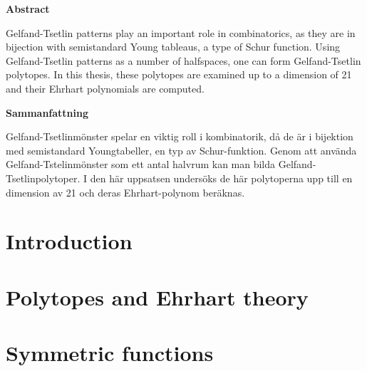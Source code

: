\documentclass[12pt, a4paper, twoside]{article}
\theoremstyle{definition}
\theoremstyle{example}
\theoremstyle{plain}
\theoremstyle{remark}
\numberwithin{equation}{section}
\numberwithin{figure}{section}
\begin{document}
\setlength{\voffset}{0cm}
\setlength{\hoffset}{0cm}

\setlength{\voffset}{-2.54cm}
\setlength{\hoffset}{-2.54cm}



\clearpage{\thispagestyle{empty}\cleardoublepage}

\begin{center}
	\textbf{Abstract}
\end{center}
    Gelfand-Tsetlin patterns play an important role in combinatorics, as they are in bijection with semistandard Young tableaus, a type of Schur function. Using Gelfand-Tsetlin patterns as a number of halfspaces, one can form Gelfand-Tsetlin polytopes. In this thesis, these polytopes are examined up to a dimension of 21 and their Ehrhart polynomials are computed.

\bigskip

\begin{center}
	\textbf{Sammanfattning}
\end{center}
    Gelfand-Tsetlinmönster spelar en viktig roll i kombinatorik, då de är i bijektion med semistandard Youngtabeller, en typ av Schur-funktion. Genom att använda Gelfand-Tstelinmönster som ett antal halvrum kan man bilda Gelfand-Tsetlinpolytoper. I den här uppsatsen undersöks de här polytoperna upp till en dimension av 21 och deras Ehrhart-polynom beräknas.


\clearpage{\thispagestyle{empty}\cleardoublepage}
{\hypersetup{linkcolor=black}
\tableofcontents
}
\clearpage

\section{Introduction}
	
\clearpage

\section{Polytopes and Ehrhart theory} \label{polytopes}
	
\clearpage

\section{Symmetric functions} \label{symfuncs}
	
\clearpage
\end{document}
